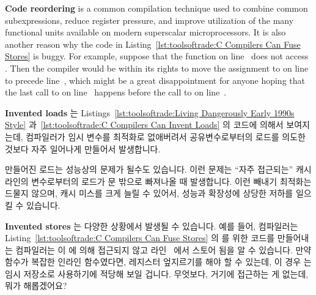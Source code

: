 {{{{\begin{lineref}
{\bf Code reordering} is a common compilation technique used to
combine common subexpressions, reduce register pressure, and
improve utilization of the many functional units available on
modern superscalar microprocessors.
It is also another reason why the code in
Listing~\ref{lst:toolsoftrade:C Compilers Can Fuse Stores}
is buggy.
For example, suppose that the  function on
line~
does not access .
Then the compiler would be within its rights to move the assignment
to  on
line~ to precede line~, which might
be a great disappointment for anyone hoping that the last call to
 on line~ happens before the call to
 on line~.
\fi
\end{lineref}

{\bf Invented loads} 는
Listings~\ref{lst:toolsoftrade:Living Dangerously Early 1990s Style}
과~\ref{lst:toolsoftrade:C Compilers Can Invent Loads} 의 코드에 의해서
보여지는데, 컴파일러가 임시 변수를 최적화로 없애버려서 공유변수로부터의 로드를
의도한 것보다 자주 일어나게 만들어서 발생합니다.

만들어진 로드는 성능상의 문제가 될수도 있습니다.
이런 문제는 ``자주 접근되는'' 캐시라인의 변수로부터의 로드가  문 밖으로
빠져나올 때 발생합니다.
이런 빼내기 최적화는 드물지 않으며, 캐시 미스를 크게 늘릴 수 있어서, 성능과
확장성에 상당한 저하를 일으킬 수 있습니다.

\begin{lineref}
{\bf Invented stores} 는 다양한 상황에서 발생될 수 있습니다.
예를 들어, 컴파일러는
Listing~\ref{lst:toolsoftrade:C Compilers Can Fuse Stores} 의
 를 위한 코드를 만들어내는 컴파일러는
 이  에 의해 접근되지 않고
라인~ 에서 스토어 됨을 알 수 있습니다.
만약  함수가 복잡한 인라인 함수였다면, 레지스터 엎지르기를
해야 할 수 있는데, 이 경우  는 임시 저장소로 사용하기에
적당해 보일 겁니다.
무엇보다, 거기에 접근하는 게 없는데, 뭐가 해롭겠어요?


\end{lineref}}}}}
